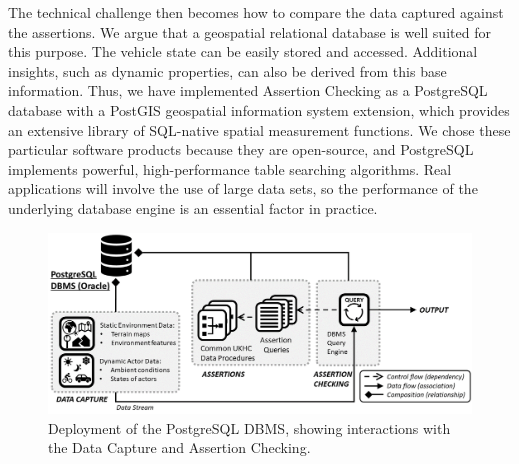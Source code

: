 The technical challenge then becomes how to compare the data captured against the assertions. We argue that a geospatial relational database is well suited for this purpose. The vehicle state can be easily stored and accessed. Additional insights, such as dynamic properties, can also be derived from this base information. 
%
Thus, we have implemented Assertion Checking as a PostgreSQL database with a PostGIS geospatial information system extension, which provides an extensive library of SQL-native spatial measurement functions. We chose these particular software products because they are open-source, and PostgreSQL implements powerful, high-performance table searching algorithms.
Real applications will involve the use of large data sets, so the performance of the underlying database engine is an essential factor in practice. %

\begin{figure}[h!]
    \centering
    \includegraphics[width=18cm]{../other/figures/DBMS_deployment.png}
    \caption{Deployment of the PostgreSQL DBMS, showing interactions with the Data Capture and Assertion Checking.}
    \label{fig:dbms_deployment}
\end{figure}


